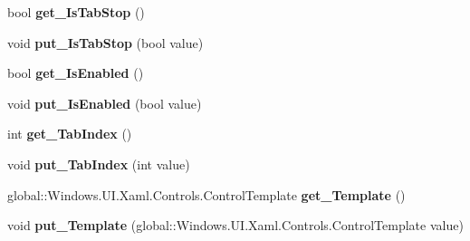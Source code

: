 \begin{DoxyCompactItemize}
\item 
\mbox{\label{interface_windows_1_1_u_i_1_1_xaml_1_1_controls_1_1_i_control_a20a0b52e3d736f000750ae5521ff5331}} 
bool {\bfseries get\+\_\+\+Is\+Tab\+Stop} ()
\item 
\mbox{\label{interface_windows_1_1_u_i_1_1_xaml_1_1_controls_1_1_i_control_aa68f56eae9d742596d921ebd0fa1d01a}} 
void {\bfseries put\+\_\+\+Is\+Tab\+Stop} (bool value)
\item 
\mbox{\label{interface_windows_1_1_u_i_1_1_xaml_1_1_controls_1_1_i_control_af6badb421eed5eedf78de5f6a798069f}} 
bool {\bfseries get\+\_\+\+Is\+Enabled} ()
\item 
\mbox{\label{interface_windows_1_1_u_i_1_1_xaml_1_1_controls_1_1_i_control_a77bf29586295b2ff15c2306dc6daf932}} 
void {\bfseries put\+\_\+\+Is\+Enabled} (bool value)
\item 
\mbox{\label{interface_windows_1_1_u_i_1_1_xaml_1_1_controls_1_1_i_control_a0849d00c16f282e234c52079d37fbd5a}} 
int {\bfseries get\+\_\+\+Tab\+Index} ()
\item 
\mbox{\label{interface_windows_1_1_u_i_1_1_xaml_1_1_controls_1_1_i_control_a18bbebda6a6cee0159bb14a9ac6ee66f}} 
void {\bfseries put\+\_\+\+Tab\+Index} (int value)
\item 
\mbox{\label{interface_windows_1_1_u_i_1_1_xaml_1_1_controls_1_1_i_control_a81ca470482b238153cd3f15d30056ed8}} 
global\+::\+Windows.\+U\+I.\+Xaml.\+Controls.\+Control\+Template {\bfseries get\+\_\+\+Template} ()
\item 
\mbox{\label{interface_windows_1_1_u_i_1_1_xaml_1_1_controls_1_1_i_control_a47a20a386ef872f62d75cd4371bdc883}} 
void {\bfseries put\+\_\+\+Template} (global\+::\+Windows.\+U\+I.\+Xaml.\+Controls.\+Control\+Template value)

\end{DoxyCompactItemize}
